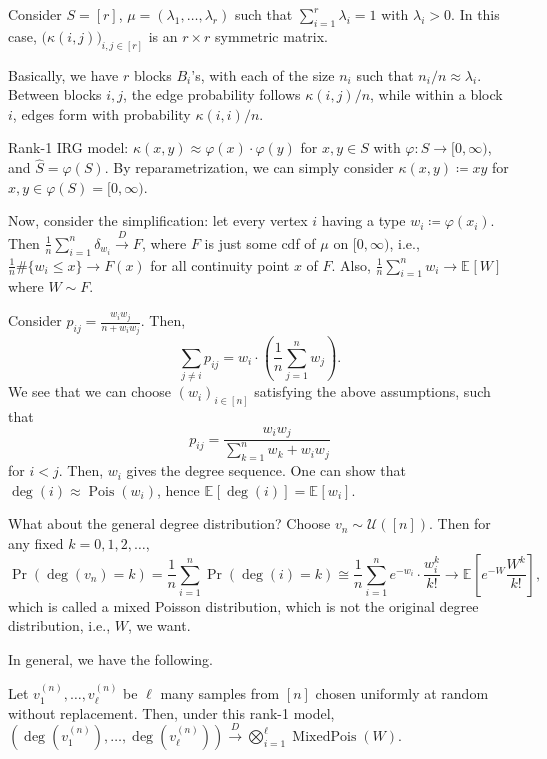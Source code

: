 \begin{eg}
	Consider \(S = [r]\), \(\mu = (\lambda _1, \dots , \lambda _r)\) such that \(\sum_{i=1}^{r} \lambda _i = 1\) with \(\lambda _i > 0\). In this case, \(\big(\kappa (i, j)\big)_{i, j \in [r]}\) is an \(r \times r\) symmetric matrix.

	Basically, we have \(r\) blocks \(B_i\)'s, with each of the size \(n_i\) such that \(n_i / n \approx \lambda _i\). Between blocks \(i, j\), the edge probability follows \(\kappa (i, j) / n\), while within a block \(i\), edges form with probability \(\kappa (i, i) / n\).
\end{eg}

Rank-1 IRG model: \(\kappa (x, y) \approx \varphi (x) \cdot \varphi (y)\) for \(x, y \in S\) with \(\varphi \colon S \to [0, \infty )\), and \(\hat{S} = \varphi (S)\). By reparametrization, we can simply consider \(\kappa (x, y) \coloneqq xy\) for \(x, y \in \varphi (S) = [0, \infty )\).

Now, consider the simplification: let every vertex \(i\) having a type \(w_i \coloneqq \varphi (x_i)\). Then \(\frac{1}{n}\sum_{i=1}^{n} \delta _{w_i} \overset{D}{\to} F\), where \(F\) is just some cdf of \(\mu \) on \([0, \infty )\), i.e., \(\frac{1}{n}\#\{ w_i \leq x \} \to F(x)\) for all continuity point \(x\) of \(F\). Also, \(\frac{1}{n} \sum_{i=1}^{n} w_i \to \mathbb{E}_{}[W] \) where \(W \sim F\).

Consider \(p_{ij} = \frac{w_i w_j}{n + w_i w_j}\). Then,
\[
	\sum_{j \neq i} p_{ij}
	= w_i \cdot \left( \frac{1}{n}\sum_{j=1}^{n} w_j \right).
\]
We see that we can choose \((w_i)_{i \in [n]}\) satisfying the above assumptions, such that
\[
	p_{ij}
	= \frac{w_i w_j}{\sum_{k=1}^{n} w_k + w_i w_j}
\]
for \(i < j\). Then, \(w_i\) gives the degree sequence. One can show that \(\deg (i) \approx \operatorname{Pois}(w_i) \), hence \(\mathbb{E}_{}[\deg (i)] = \mathbb{E}_{}[w_i] \).

What about the general degree distribution? Choose \(v_n \sim \mathcal{U} ([n])\). Then for any fixed \(k=0, 1, 2, \dots \),
\[
	\Pr_{}\left(\deg (v_n) = k\right)
	= \frac{1}{n} \sum_{i=1}^{n} \Pr_{}\left(\deg (i) = k\right)
	\cong \frac{1}{n} \sum_{i=1}^{n} e^{-w_i} \cdot \frac{w_i^k}{k!}
	\to \mathbb{E}_{}\left[ e^{-W} \frac{W^k}{k!} \right] ,
\]
which is called a mixed Poisson distribution, which is not the original degree distribution, i.e., \(W\), we want.

In general, we have the following.

\begin{theorem}
	Let \(v_1^{(n)}, \dots , v_{\ell }^{(n)} \) be \(\ell \) many samples from \([n]\) chosen uniformly at random without replacement. Then, under this rank-1 model, \((\deg (v_1^{(n)}), \dots , \deg (v_{\ell } ^{(n)})) \overset{D}{\to} \bigotimes _{i=1}^{\ell} \operatorname{MixedPois}(W) \).
\end{theorem}

